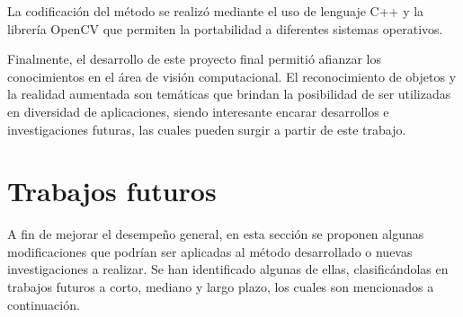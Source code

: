 La codificación del método se realizó mediante el uso de lenguaje C++ y la librería OpenCV que permiten la portabilidad a diferentes sistemas operativos.

Finalmente, el desarrollo de este proyecto final permitió afianzar los conocimientos en el área de visión computacional. El reconocimiento de objetos y la realidad aumentada son temáticas que brindan la posibilidad de ser utilizadas en diversidad de aplicaciones, siendo interesante encarar desarrollos e investigaciones futuras, las cuales pueden surgir a partir de este trabajo.
\section{Trabajos futuros}
A fin de mejorar el desempeño general, en esta sección se proponen algunas modificaciones que podrían ser aplicadas al método desarrollado o nuevas investigaciones a realizar. Se han identificado algunas de ellas, clasificándolas en trabajos futuros a corto, mediano y largo plazo, los cuales son mencionados a continuación.

